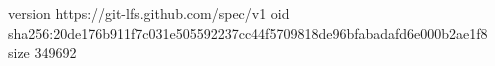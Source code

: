 version https://git-lfs.github.com/spec/v1
oid sha256:20de176b911f7c031e505592237cc44f5709818de96bfabadafd6e000b2ae1f8
size 349692

